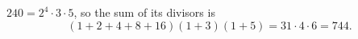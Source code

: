 $240=2^4\cdot3\cdot5$, so the sum of its divisors is
\[
(1+2+4+8+16)(1+3)(1+5)=31\cdot4\cdot6=\boxed{744}.
\]

